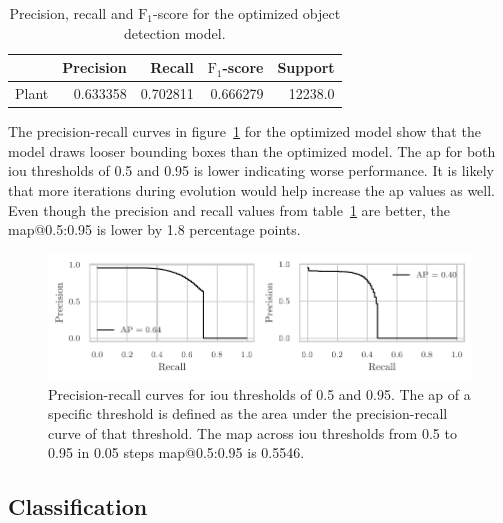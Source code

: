 \documentclass[final]{vutinfth} %
\begin{document}
\begin{table}[h]
  \centering
  \begin{tabular}{lrrrr}
    \toprule
    {} &  Precision &    Recall &  $\mathrm{F}_1$-score &  Support \\
    \midrule
    Plant        &   \num{0.633358} &  \num{0.702811} &  \num{0.666279} &  \num{12238.0} \\
    \bottomrule
  \end{tabular}
  \caption{Precision, recall and $\mathrm{F}_1$-score for the
    optimized object detection model.}
  \label{tab:yolo-metrics-hyp}
\end{table}

The precision-recall curves in figure~\ref{fig:yolo-ap-hyp} for the
optimized model show that the model draws looser bounding boxes than
the optimized model. The \gls{ap} for both \gls{iou} thresholds of
\num{0.5} and \num{0.95} is lower indicating worse performance. It is
likely that more iterations during evolution would help increase the
\gls{ap} values as well. Even though the precision and recall values
from table~\ref{tab:yolo-metrics-hyp} are better, the
\gls{map}@0.5:0.95 is lower by \num{1.8} percentage points.

\begin{figure}
  \centering
  \includegraphics{graphics/APpt5-pt95-final.pdf}
  \caption[Hyperparameter optimized object detection AP@0.5 and
  AP@0.95]{Precision-recall curves for \gls{iou} thresholds of
    \num{0.5} and \num{0.95}. The \gls{ap} of a specific threshold is
    defined as the area under the precision-recall curve of that
    threshold. The \gls{map} across \gls{iou} thresholds from
    \num{0.5} to \num{0.95} in \num{0.05} steps \gls{map}@0.5:0.95 is
    \num{0.5546}.}
  \label{fig:yolo-ap-hyp}
\end{figure}

\subsection{Classification}
\label{ssec:classifier-eval}
\end{document}
